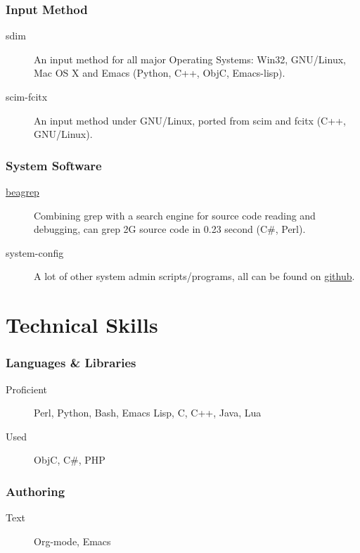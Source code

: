 \documentclass[11pt,dvipdfmx,CJKbookmarks]{article}
\begin{document}
\begin{CJK*}{UTF8}{simsun}
\subsubsection{Input Method}
\label{sec-2-0-3}
\begin{description}
\item[{sdim}] An input method for all major Operating Systems: Win32,
GNU/Linux, Mac OS X and Emacs (Python, C++, ObjC,
Emacs-lisp).

\item[{scim-fcitx}] An input method under GNU/Linux, ported from scim
and fcitx (C++, GNU/Linux).
\end{description}

\subsubsection{System Software}
\label{sec-2-0-4}

\begin{description}
\item[{\href{https://github.com/baohaojun/beagrep}{beagrep}}] Combining grep with a search engine for source code
reading and debugging, can grep 2G source code in 0.23
second (C\#, Perl).

\item[{system-config}] A lot of other system admin scripts/programs, all
can be found on \href{https://github.com/baohaojun}{github}.
\end{description}


\section{Technical Skills}
\label{sec-3}

\subsubsection{Languages \& Libraries}
\label{sec-3-0-1}
\begin{description}
\item[{Proficient}] Perl, Python, Bash, Emacs Lisp, C, C++, Java, Lua

\item[{Used}] ObjC, C\#, PHP
\end{description}
\subsubsection{Authoring}
\label{sec-3-0-2}
\begin{description}
\item[{Text}] Org-mode, Emacs
\end{description}

\end{CJK*}
\end{document}
